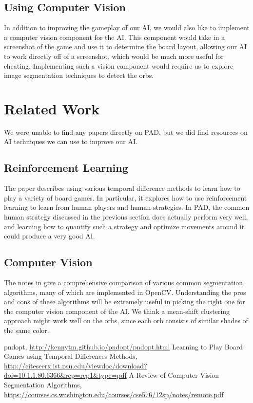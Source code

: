 \documentclass[journal,final,letterpaper,11pt]{IEEEtran}
\begin{document}
\subsection{Using Computer Vision}
In addition to improving the gameplay of our AI, we would also like to implement a computer vision component for the AI. This component would take in a screenshot of the game and use it to determine the board layout, allowing our AI to work directly off of a screenshot, which would be much more useful for cheating. Implementing such a vision component would require us to explore image segmentation techniques to detect the orbs.
\vspace*{-0.1in}
\section{Related Work}
We were unable to find any papers directly on PAD, but we did find resources on AI techniques we can use to improve our AI.
\vspace*{-0.15in}
\subsection{Reinforcement Learning}
The paper \cite{2} describes using various temporal difference methods to learn how to play a variety of board games. In particular, it explores how to use reinforcement learning to learn from human players and human strategies. In PAD, the common human strategy discussed in the previous section does actually perform very well, and learning how to quantify such a strategy and optimize movements around it could produce a very good AI.
\vspace*{-0.15in}
\subsection{Computer Vision}
The notes in \cite{3} give a comprehensive comparison of various common segmentation algorithms, many of which are implemented in OpenCV. Understanding the pros and cons of these algorithms will be extremely useful in picking the right one for the computer vision component of the AI. We think a mean-shift clustering approach might work well on the orbs, since each orb consists of similar shades of the same color.

\begin{thebibliography}{1}
 pndopt, \url{http://kennytm.github.io/pndopt/pndopt.html}
 Learning to Play Board Games using Temporal Differences Methods, \url{http://citeseerx.ist.psu.edu/viewdoc/download?doi=10.1.1.80.6366&rep=rep1&type=pdf}
 A Review of Computer Vision Segmentation Algorithms, \url{https://courses.cs.washington.edu/courses/cse576/12sp/notes/remote.pdf}


\end{thebibliography}
\end{document}
